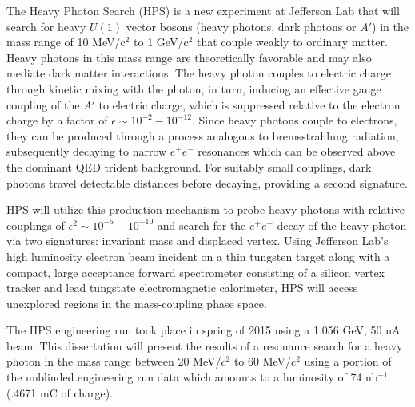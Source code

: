 
\pagestyle{plain}
The Heavy Photon Search (HPS) is a new experiment at Jefferson Lab that will 
search for heavy $U(1)$ vector bosons (heavy photons, dark photons or $A'$)
in the mass range of 10 MeV/c$^{2}$ to 1 GeV/c$^{2}$ that couple weakly to
ordinary matter.  Heavy photons in this mass range are theoretically favorable
and may also mediate dark matter interactions.  The heavy photon couples to 
electric charge through kinetic mixing with the photon, in turn, inducing an 
effective gauge coupling of the $A'$ to electric charge, which is suppressed
relative to the electron charge by a factor of 
$\epsilon \sim 10^{-2} - 10^{-12}$.  Since heavy photons couple to electrons, 
they can be produced through a process analogous to bremsstrahlung radiation, 
subsequently decaying to narrow $e^{+}e^{-}$ resonances which can be observed 
above the dominant QED trident background.  For suitably small couplings, dark
photons travel detectable distances before decaying, providing a second 
signature.

HPS will utilize this production mechanism to probe heavy photons with relative 
couplings of $\epsilon^2 \sim 10^{-5} - 10^{-10}$ and search for the 
$e^{+}e^{-}$ decay of the
heavy photon via two signatures: invariant mass and displaced vertex.  Using 
Jefferson Lab’s high luminosity electron beam incident on a thin tungsten target along with a compact, large 
acceptance forward spectrometer consisting of a silicon vertex tracker and lead
tungstate electromagnetic calorimeter, HPS will access unexplored regions in the
mass-coupling phase space. 

The HPS engineering run took place in spring of 2015 using a 1.056 GeV, 50 nA 
beam.  This dissertation will present the results of a resonance search for a heavy
photon in the mass range between 20 MeV/$c^2$ to 60 MeV/$c^2$ using a portion of the unblinded
engineering run data which amounts to a luminosity of 74 nb$^{-1}$
(.4671 mC of charge).
